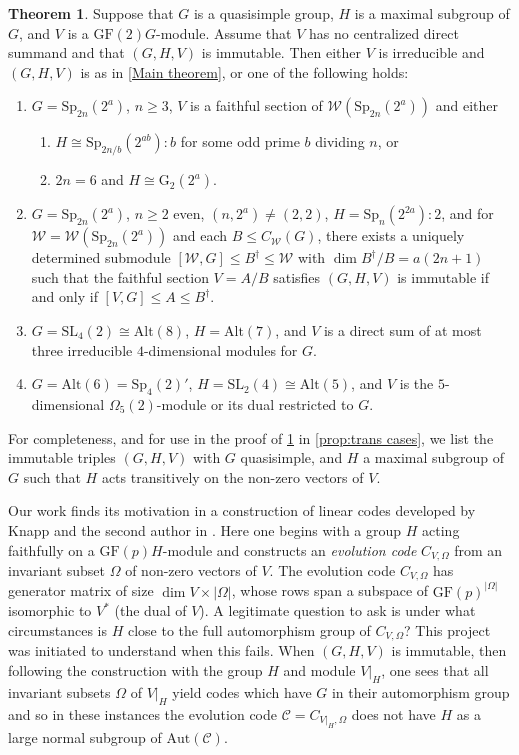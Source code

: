 \documentclass[12pt]{amsart}
\theoremstyle{remark}
\theoremstyle{notation}
\theoremstyle{definition}
\newtheorem{theoremB}{Theorem}
\newcommand{\Aut}{\mathrm{Aut}}
\newcommand{\GF}{\mathrm{GF}}
\newcommand{\Sp}{\mathrm{Sp}}
\newcommand{\SL}{\mathrm{SL}}
\newcommand{\0}{\emptyset}
\newcommand{\Alt}{\mathrm{Alt}}
\begin{document}
\begin{theoremB}\label{thm:Theorem B}
Suppose that $G$ is a quasisimple group, $H$ is a maximal subgroup of $G$, and $V$ is a $\GF(2)G$-module.
Assume that $V$ has no centralized direct summand and that $(G,H,V)$ is immutable.
Then either $V$ is irreducible and $(G,H,V)$ is as in \cref{Main theorem}, or one of the following holds:
\begin{enumerate}
  \item $G = \Sp_{2n}(2^a)$, $n \ge 3$,  $V$ is a faithful section of $\mathcal W(\Sp_{2n}(2^a))$ and either
   \begin{enumerate}\item$H \cong \Sp_{2n/b}(2^{ab}){:}b$ for some odd prime $b$ dividing $n$, or \item $2n = 6$ and $H \cong \mathrm{G}_2(2^a)$.
    \end{enumerate}
  \item $G = \Sp_{2n}(2^a)$, $n \ge 2$ even, $(n,2^a) \neq (2,2)$, $H = \Sp_n(2^{2a}){:}2$, and for $\mathcal W = \mathcal W(\Sp_{2n}(2^a))$ and each $B \le C_{\mathcal W}(G)$, there exists a uniquely determined submodule
  $[ \mathcal W, G ] \le B^\dagger \le \mathcal W$ with $\dim B^\dagger / B = a(2n+1)$ such that the faithful section $V = A/B$ satisfies $(G,H,V)$ is immutable if and only if $[V,G] \le A \le B^\dagger$.
  \item $G = \SL_4(2) \cong \Alt(8)$, $H = \Alt(7)$, and $V$ is a direct sum of at most three irreducible $4$-dimensional modules for $G$.
  \item $G = \Alt(6) = \Sp_4(2)'$, $H = \SL_2(4) \cong \Alt(5)$, and $V$ is the $5$-dimensional $\Omega_5(2)$-module or its dual restricted to $G$.
\end{enumerate}
\end{theoremB}


For completeness, and for use in the proof of \cref{thm:Theorem B} in \cref{prop:trans cases}, we list the immutable triples $(G,H,V)$ with $G$ quasisimple, and $H$ a maximal subgroup of $G$ such that $H$ acts transitively on the non-zero vectors of $V$.



 Our work finds its motivation in a construction of linear codes developed by Knapp and the second author    in \cite{KnappRodrigues}. Here one begins with a group $H$ acting faithfully on a $\GF(p)H$-module and constructs an \emph{evolution code} $C_{V,\Omega}$ from an invariant subset $\Omega$ of non-zero vectors of $V$.   The evolution code $C_{V,\Omega}$ has generator matrix of size $\dim V \times |\Omega|$, whose rows span a subspace of $\GF(p)^{|\Omega|}$ isomorphic to $V^*$ (the dual of $V$). A legitimate question to ask is under what circumstances is $H$ close to the full automorphism group of $C_{V,\Omega}$?
This project was initiated to understand when this fails.  When $(G,H,V)$ is immutable, then following the construction with the group $H$ and module $V|_H$, one sees that all invariant subsets   $\Omega$ of $V|_H$ yield codes which have $G$ in their automorphism group and so in these instances the evolution code $\mathcal C=C_{V|_H,\Omega}$ does not have  $H$ as a large normal subgroup of $\Aut(\mathcal C)$.
\end{document}
